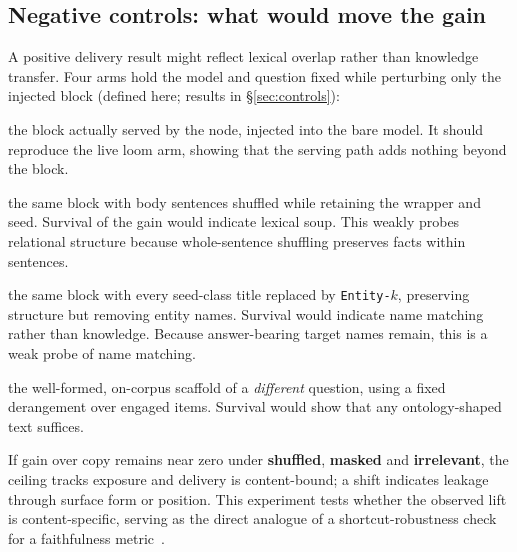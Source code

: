 \documentclass[10pt,twocolumn]{article}
\begin{document}
\subsection{Negative controls: what would move the gain}\label{sec:ceiling-controls}
A positive delivery result might reflect lexical overlap rather than knowledge transfer. Four arms hold the model and question fixed while perturbing only the injected block (defined here; results in \S\ref{sec:controls}):
\begin{description}[topsep=2pt,itemsep=1pt,leftmargin=0pt,font=\normalfont\itshape]
\item[true] the block actually served by the node, injected into the bare model. It should reproduce the live loom arm, showing that the serving path adds nothing beyond the block.
\item[shuffled] the same block with body sentences shuffled while retaining the wrapper and seed. Survival of the gain would indicate lexical soup. This weakly probes relational structure because whole-sentence shuffling preserves facts within sentences.
\item[masked] the same block with every seed-class title replaced by \texttt{Entity-$k$}, preserving structure but removing entity names. Survival would indicate name matching rather than knowledge. Because answer-bearing target names remain, this is a weak probe of name matching.
\item[irrelevant] the well-formed, on-corpus scaffold of a \emph{different} question, using a fixed derangement over engaged items. Survival would show that any ontology-shaped text suffices.
\end{description}
If gain over copy remains near zero under \textbf{shuffled}, \textbf{masked} and \textbf{irrelevant}, the ceiling tracks exposure and delivery is content-bound; a shift indicates leakage through surface form or position. This experiment tests whether the observed lift is content-specific, serving as the direct analogue of a shortcut-robustness check for a faithfulness metric~\cite{gao2023alce}.
\end{document}
